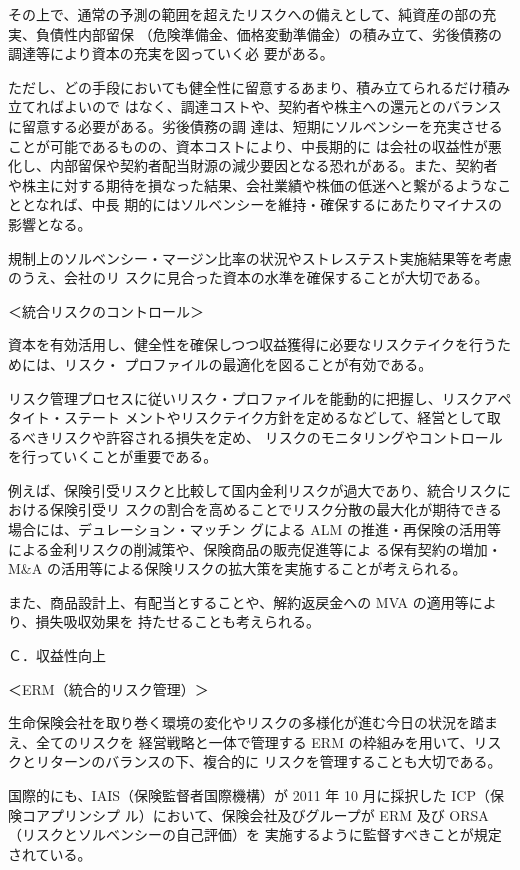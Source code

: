 \documentclass[report,gutter=10mm,fore-edge=10mm,uplatex,dvipdfmx]{jlreq}
\begin{document}
 その上で、通常の予測の範囲を超えたリスクへの備えとして、純資産の部の充実、負債性内部留保
（危険準備金、価格変動準備金）の積み立て、劣後債務の調達等により資本の充実を図っていく必
要がある。

 ただし、どの手段においても健全性に留意するあまり、積み立てられるだけ積み立てればよいので
はなく、調達コストや、契約者や株主への還元とのバランスに留意する必要がある。劣後債務の調
達は、短期にソルベンシーを充実させることが可能であるものの、資本コストにより、中長期的に
は会社の収益性が悪化し、内部留保や契約者配当財源の減少要因となる恐れがある。また、契約者
や株主に対する期待を損なった結果、会社業績や株価の低迷へと繋がるようなこととなれば、中長
期的にはソルベンシーを維持・確保するにあたりマイナスの影響となる。

 規制上のソルベンシー・マージン比率の状況やストレステスト実施結果等を考慮のうえ、会社のリ
スクに見合った資本の水準を確保することが大切である。

＜統合リスクのコントロール＞

 資本を有効活用し、健全性を確保しつつ収益獲得に必要なリスクテイクを行うためには、リスク・
プロファイルの最適化を図ることが有効である。

 リスク管理プロセスに従いリスク・プロファイルを能動的に把握し、リスクアペタイト・ステート
メントやリスクテイク方針を定めるなどして、経営として取るべきリスクや許容される損失を定め、
リスクのモニタリングやコントロールを行っていくことが重要である。

 例えば、保険引受リスクと比較して国内金利リスクが過大であり、統合リスクにおける保険引受リ
スクの割合を高めることでリスク分散の最大化が期待できる場合には、デュレーション・マッチン
グによる ALM の推進・再保険の活用等による金利リスクの削減策や、保険商品の販売促進等によ
る保有契約の増加・M\&A の活用等による保険リスクの拡大策を実施することが考えられる。

 また、商品設計上、有配当とすることや、解約返戻金への MVA の適用等により、損失吸収効果を
持たせることも考えられる。

Ｃ．収益性向上

＜ERM（統合的リスク管理）＞

 生命保険会社を取り巻く環境の変化やリスクの多様化が進む今日の状況を踏まえ、全てのリスクを
経営戦略と一体で管理する ERM の枠組みを用いて、リスクとリターンのバランスの下、複合的に
リスクを管理することも大切である。

 国際的にも、IAIS（保険監督者国際機構）が 2011 年 10 月に採択した ICP（保険コアプリンシプ
ル）において、保険会社及びグループが ERM 及び ORSA（リスクとソルベンシーの自己評価）を
実施するように監督すべきことが規定されている。
\end{document}
